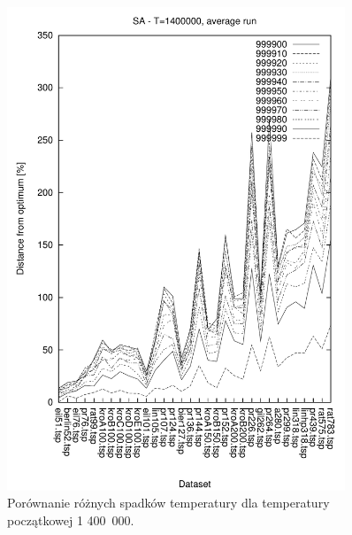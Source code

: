 \begin{figure}
\begin{center}
\includegraphics[width=0.9\textwidth]{wykresy/sa/sa_1400000_av}
\end{center}
\caption{Porównanie różnych spadków temperatury dla temperatury początkowej 1 400~000.}
\label{sa_1400000_av}
\end{figure}

